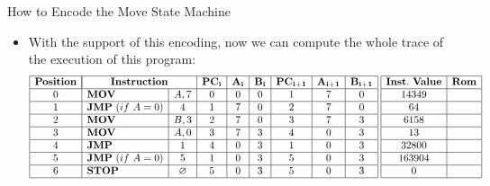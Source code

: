 \begin{frame}[allowframebreaks]{How to Encode the Move State Machine}
\begin{itemize}
\item With the support of this encoding, now we can compute the whole trace of the execution of this program:
\[
\begin{array}{|c|l|c|c|c|c|c|c|c|}
\hline
\mathbf{Position} & \multicolumn{2}{|c|}{\mathbf{Instruction}} & \mathbf{PC_i} & \mathbf{A_i} & \mathbf{B_i} & \mathbf{PC_{i+1}} & \mathbf{A_{i+1}} & \mathbf{B_{i+1}} \\ \hline
0 & \mathbf{MOV} & A, 7 & 0 & 0 & 0 & 1 & 7 & 0 \\ \hline
1 & \mathbf{JMP}~(if~A = 0) & 4 & 1 & 7 & 0 & 2 & 7 & 0 \\ \hline
2 & \mathbf{MOV} & B, 3 & 2 & 7 & 0 & 3 & 7 & 3 \\ \hline
3 & \mathbf{MOV} & A, 0 & 3 & 7 & 3 & 4 & 0 & 3 \\ \hline
4 & \mathbf{JMP} & 1 & 4 & 0 & 3 & 1 & 0 & 3 \\ \hline
5 & \mathbf{JMP}~(if~A = 0) & 5 & 1 & 0 & 3 & 5 & 0 & 3 \\ \hline
6 & \mathbf{STOP} & \emptyset & 5 & 0 & 3 & 5 & 0 & 3 \\ \hline
\end{array}
\hspace{0.1cm}
\begin{array}{|c|c|}
\hline
\mathbf{Inst.~Value} & \mathbf{Rom} \\ \hline
14349 & \\ \hline
64 & \\ \hline
6158 & \\ \hline
13 & \\ \hline
32800 & \\ \hline
163904 & \\ \hline
0 & \\ \hline
\end{array}
\]
\end{itemize}
\end{frame}












